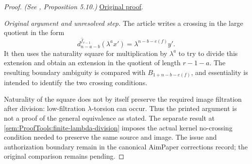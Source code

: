 \begin{proof}
\textit{(See \cite{LWX126}, Proposition 5.10.)} \href{paper/main.tex.html#L1519}{Original proof}.

\textit{Original argument and unresolved step.} The article writes a crossing in the large quotient in the form
\[
 d_{n-a-b}^{\widehat f_{r-1}}(\lambda^a x')
   =\lambda^{n-b-e(f)}y'.
\]
It then uses the naturality square for multiplication by $\lambda^a$ to try to divide this extension and obtain an extension in the quotient of length $r-1-a$. The resulting boundary ambiguity is compared with $B_{1+n-b-e(f)}$, and essentiality is intended to identify the two crossing conditions.

Naturality of the square does not by itself preserve the required image filtration after division: low-filtration $\lambda$-torsion can occur. Thus the printed argument is not a proof of the general equivalence as stated. The separate result at \ref{sem:ProofTools:finite-lambda-division} imposes the actual kernel no-crossing condition needed to preserve the same source and image. The issue and authorization boundary remain in the canonical AimPaper corrections record; the original comparison remains pending.
\end{proof}

